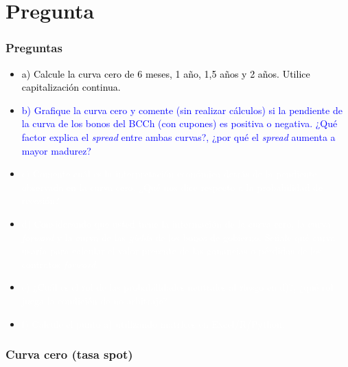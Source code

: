 \documentclass{beamer}
\begin{document}
\section{Pregunta }
\begin{frame}
  \frametitle{Preguntas}
  \begin{itemize}
    \scriptsize
    \item {\textcolor{black}{a) Calcule la curva cero de 6 meses, 1 año, 1,5 años y 2 años. Utilice capitalización continua.}}
    \vspace{3pt}
    \item {\Large\textcolor{blue}{b) Grafique la curva cero y comente (sin realizar cálculos) 
    si la pendiente de la curva de los bonos del BCCh (con cupones) es positiva o negativa. 
    ¿Qué factor explica el \textit{spread} entre ambas curvas?, ¿por qué el \textit{spread} 
    aumenta a mayor madurez?}}
    \vspace{3pt}
    \item {\textcolor{white}{c) Comente cuál es la interpretación económica detrás de la pendiente observada en la curva cero. ¿Qué nos dice respecto a la probabilidad de recesión?}}
    \vspace{3pt}
    \item {\textcolor{white}{d) Considerando que usted tiene la información de la curva cero, la curva \textit{forward} y la curva de las \textit{yields} de los bonos de gobierno. Señale qué curva usaría para calcular el valor presente de las ganancias o pérdidas de los contratos \textit{forward}.}}
    \vspace{3pt}
    \item {\textcolor{white}{e) ¿Cuál es el rol de las probabilidades neutrales al riesgo en d)?, ¿qué rol juega la condición de no arbitraje?}}
    \vspace{3pt}
    \item {\textcolor{white}{f) Calcule el punto a) utilizando matrices en Excel/R/Python.}}
    \vspace{3pt}
  \end{itemize}
\end{frame}
\begin{frame}
  \frametitle{Curva cero (tasa spot)}

    \begin{center}
      \end{center}
\end{frame}
\end{document}
